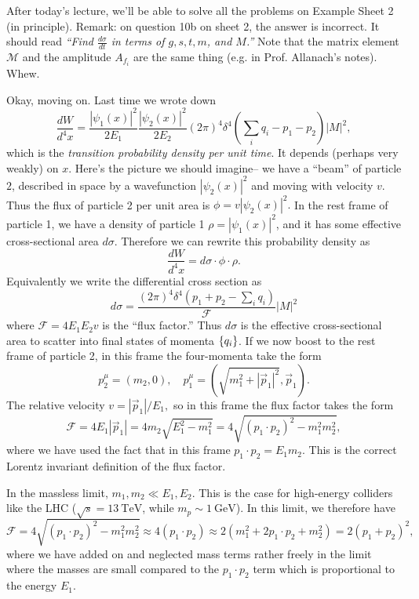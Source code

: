 After today's lecture, we'll be able to solve all the problems on Example Sheet 2 (in principle). Remark: on question 10b on sheet 2, the answer is incorrect. It should read \textit{``Find $\frac{d\sigma}{dt}$ in terms of $g,s,t,m$, and $M$.''} Note that the matrix element $\mathcal{M}$ and the amplitude $A_{f_i}$ are the same thing (e.g. in Prof. Allanach's notes). Whew.

Okay, moving on. Last time we wrote down
$$\frac{dW}{d^4x}=\frac{|\psi_1 (x)|^2}{2E_1}\frac{|\psi_2(x)|^2}{2E_2}(2\pi)^4 \delta^4(\sum_i q_i-p_1-p_2)|M|^2,$$ which is the \emph{transition probability density per unit time}. It depends (perhaps very weakly) on $x$. Here's the picture we should imagine-- we have a ``beam'' of particle $2$, described in space by a wavefunction $|\psi_2(x)|^2$ and moving with velocity $v$. Thus the flux of particle 2 per unit area is 
$\phi=v|\psi_2(x)|^2.$ In the rest frame of particle 1, we have a density of particle 1 $\rho=|\psi_1(x)|^2$, and it has some effective cross-sectional area $d\sigma$. Therefore we can rewrite this probability density as
$$\frac{dW}{d^4x}=d\sigma\cdot \phi \cdot \rho.$$
Equivalently we write the differential cross section as
$$d\sigma = \frac{(2\pi)^4 \delta^4(p_1 +p_2 -\sum_i q_i)}{\mathcal{F}}|M|^2$$
where $\mathcal{F}=4E_1E_2 v$ is the ``flux factor.'' Thus $d\sigma$ is the effective cross-sectional area to scatter into final states of momenta $\{q_i\}$. If we now boost to the rest frame of particle 2, in this frame the four-momenta take the form
$$p_2^\mu=(m_2,0),\quad p_1^\mu=(\sqrt{m_1^2+|\vec p_1|^2},\vec p_1).$$
The relative velocity $v=|\vec p_1|/E_1,$ so in this frame the flux factor takes the form
$$\mathcal{F}=4E_1|\vec p_1|=4m_2\sqrt{E_1^2-m_1^2}=4\sqrt{(p_1 \cdot p_2)^2-m_1^2m_2^2},$$
where we have used the fact that in this frame $p_1\cdot p_2 = E_1m_2$. This is the correct Lorentz invariant definition of the flux factor.

In the massless limit, $m_1,m_2\ll E_1,E_2$. This is the case for high-energy colliders like the LHC ($\sqrt{s}=\SI{13}{\tera\electronvolt}$, while $m_p\sim \SI{1}{\giga\electronvolt}$). 
In this limit, we therefore have
$$\mathcal{F}=4\sqrt{(p_1 \cdot p_2)^2-m_1^2m_2^2}\approx 4(p_1\cdot p_2) \approx 2(m_1^2+2 p_1\cdot p_2 +m_2^2) =2(p_1+p_2)^2,$$
where we have added on and neglected mass terms rather freely in the limit where the masses are small compared to the $p_1\cdot p_2$ term which is proportional to the energy $E_1$.

